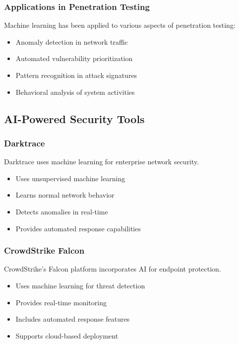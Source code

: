 \documentclass[12pt,a4paper]{report}
\begin{document}
\subsubsection{Applications in Penetration Testing}

Machine learning has been applied to various aspects of penetration testing:

\begin{itemize}
    \item Anomaly detection in network traffic
    \item Automated vulnerability prioritization
    \item Pattern recognition in attack signatures
    \item Behavioral analysis of system activities
\end{itemize}

\subsection{AI-Powered Security Tools}

\subsubsection{Darktrace}

Darktrace uses machine learning for enterprise network security.

\begin{itemize}
    \item Uses unsupervised machine learning
    \item Learns normal network behavior
    \item Detects anomalies in real-time
    \item Provides automated response capabilities
\end{itemize}

\subsubsection{CrowdStrike Falcon}

CrowdStrike's Falcon platform incorporates AI for endpoint protection.

\begin{itemize}
    \item Uses machine learning for threat detection
    \item Provides real-time monitoring
    \item Includes automated response features
    \item Supports cloud-based deployment
\end{itemize}
\end{document}
